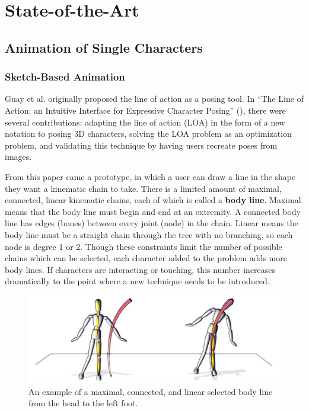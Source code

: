 \chapter{State-of-the-Art}\label{chap:sota}
\section{Animation of Single Characters}
\subsection{Sketch-Based Animation}
Guay et al. originally proposed the line of action as a posing tool. In ``The Line of Action: an Intuitive Interface for Expressive Character Posing'' (\citep{guay2013line}), there were several contributions: adapting the line of action (LOA) in the form of a new notation to posing 3D characters, solving the LOA problem as an optimization problem, and validating this technique by having users recreate poses from images. 

From this paper came a prototype, in which a user can draw a line in the shape they want a kinematic chain to take. There is a limited amount of maximal, connected, linear kinematic chains, each of which is called a \textbf{body line}. Maximal means that the body line must begin and end at an extremity. A connected body line has edges (bones) between every joint (node) in the chain. Linear means the body line must be a straight chain through the tree with no branching, so each node is degree 1 or 2. Though these constraints limit the number of possible chains which can be selected, each character added to the problem adds more body lines. If characters are interacting or touching, this number increases dramatically to the point where a new technique needs to be introduced.

\begin{figure}[!h]
\centering
\includegraphics[scale=0.4]{img/bodyline}
\caption{An example of a maximal, connected, and linear selected body line from the head to the left foot.}
\end{figure}

